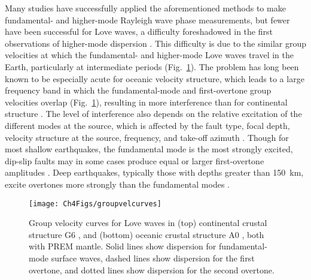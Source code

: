 \documentclass[12pt,oneside]{book}
\begin{document}
Many studies have successfully applied the aforementioned methods to make fundamental- and higher-mode Rayleigh wave phase measurements, but fewer have been successful for Love waves, a difficulty foreshadowed in the first observations of higher-mode dispersion \citep{OliverEwing1957}. This difficulty is due to the similar group velocities at which the fundamental- and higher-mode Love waves travel in the Earth, particularly at intermediate periods (Fig.~\ref{figot:grpvel}). The problem has long been known to be especially acute for oceanic velocity structure, which leads to a large frequency band in which the fundamental-mode and first-overtone group velocities overlap (Fig.~\ref{figot:grpvel}), resulting in more interference than for continental structure \citep{Thatcher&Brune1969, Forsyth1975, Nettles2011}. The level of interference also depends on the relative excitation of the different modes at the source, which is affected by the fault type, focal depth, velocity structure at the source, frequency, and take-off azimuth \citep{Jobert1964, Yoshida1983}. Though for most shallow earthquakes, the fundamental mode is the most strongly excited, dip-slip faults may in some cases produce equal or larger first-overtone amplitudes \citep{FukaoAbe1971, Yoshida1983}. Deep earthquakes, typically those with depths greater than 150~km, excite overtones more strongly than the fundamental modes \citep{LaskeWidmer2007}.

\begin{figure} 
\begin{center}
\texttt{[image: Ch4Figs/groupvelcurves]} 
\caption[Love wave group velocity curves]{Group velocity curves for Love waves in (top) continental crustal structure G6 \citep{CRUST2}, and (bottom) oceanic crustal structure A0 \citep{Mooneyetal1998,CRUST2}, both with PREM mantle. Solid lines show dispersion for fundamental-mode surface waves, dashed lines show dispersion for the first overtone, and dotted lines show dispersion for the second overtone. }
\label{figot:grpvel}
\end{center}
\end{figure}
%
\end{document}

